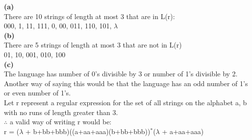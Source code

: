 \documentclass{homework}
\begin{document}
\maketitle

\question

\textbf{(a)}\\
There are 10 strings of length at most 3 that are in L(r):\\
000, 1, 11, 111, 0, 00, 011, 110, 101, $\lambda$\\

\textbf{(b)}\\
There are 5 strings of length at most 3 that are not in L(r)\\
01, 10, 001, 010, 100\\

\textbf{(c)}\\
The language has number of 0's divisible by 3 or number of 1's divisible by 2.\\
Another way of saying this would be that the language has an odd number of 1's or even number of 1's.\\

\question
Let r represent a regular expression for the set of all strings on the alphabet {a, b} with no runs of length greater than 3.\\
\newline
$\therefore$ a valid way of writing r would be:\\
r = ($\lambda$ + b+bb+bbb)((a+aa+aaa)(b+bb+bbb))$^*$($\lambda$ + a+aa+aaa)\\
\end{document}
